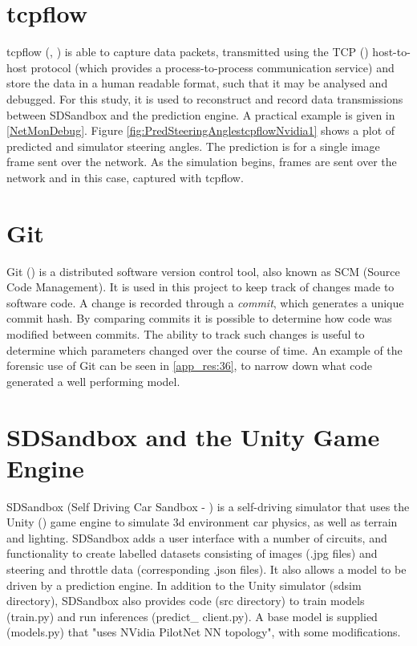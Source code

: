 \section{tcpflow}
tcpflow (\cite{tcpflowElson2013}, \cite{garfinkel2013passive}) is able to capture data packets, transmitted using the TCP (\cite{rfc793}) host-to-host protocol (which provides a process-to-process communication service) and store the data in a human readable format, such that it may be analysed and debugged. For this study, it is used to reconstruct and record data transmissions between SDSandbox and the prediction engine. A practical example is given in \ref{NetMonDebug}.
Figure \ref{fig:PredSteeringAnglestcpflowNvidia1} shows a plot of predicted and simulator steering angles. The prediction is for a single image frame sent over the network. As the simulation begins, frames are sent over the network and in this case, captured with tcpflow.

\section{Git}
Git (\cite{chacon2014pro}) is a distributed software version control tool, also known as SCM (Source Code Management). It is used in this project to keep track of changes made to software code. A change is recorded through a \textit{commit}, which generates a unique commit hash. By comparing commits it is possible to determine how code was modified between commits. The ability to track such changes is useful to determine which parameters changed over the course of time. An example of the forensic use of Git can be seen in \ref{app_res:36}, to narrow down what code generated a well performing model.


\section{SDSandbox and the Unity Game Engine}
\label{met:sdsandboxAndUnity}
SDSandbox (Self Driving Car Sandbox - \cite{SDSandboxSim}) is a self-driving simulator that uses the Unity (\cite{haas2014history}) game engine to simulate 3d environment car physics, as well as terrain and lighting. SDSandbox adds a user interface with a number of circuits, and functionality to create labelled datasets consisting of images (.jpg files) and steering and throttle data (corresponding .json files). It also allows a model to be driven by a prediction engine. In addition to the Unity simulator (sdsim directory), SDSandbox also provides code (src directory) to train models (train.py) and run inferences (predict\_ client.py). A base model is supplied (models.py) that "uses NVidia PilotNet NN topology", with some modifications.  
  
